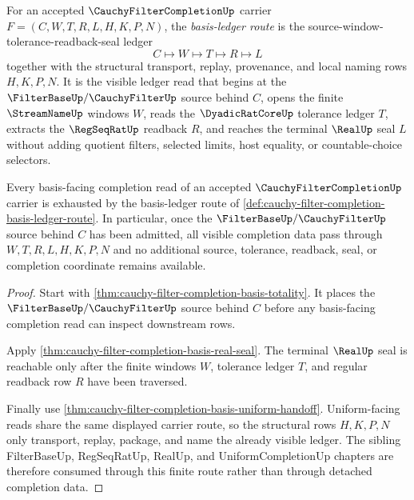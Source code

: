 \begin{definition}
\label{def:cauchy-filter-completion-basis-ledger-route}
For an accepted $\CauchyFilterCompletionUp$ carrier $F=(C,W,T,R,L,H,K,P,N)$, the \emph{basis-ledger route} is the source-window-tolerance-readback-seal ledger
$$
C \longmapsto W \longmapsto T \longmapsto R \longmapsto L
$$
together with the structural transport, replay, provenance, and local naming rows $H,K,P,N$. It is the visible ledger read that begins at the $\FilterBaseUp/\CauchyFilterUp$ source behind $C$, opens the finite $\StreamNameUp$ windows $W$, reads the $\DyadicRatCoreUp$ tolerance ledger $T$, extracts the $\RegSeqRatUp$ readback $R$, and reaches the terminal $\RealUp$ seal $L$ without adding quotient filters, selected limits, host equality, or countable-choice selectors.
\end{definition}

\begin{theorem}
\label{thm:cauchy-filter-completion-basis-ledger-exhaustion}
Every basis-facing completion read of an accepted $\CauchyFilterCompletionUp$ carrier is exhausted by the basis-ledger route of \autoref{def:cauchy-filter-completion-basis-ledger-route}. In particular, once the $\FilterBaseUp/\CauchyFilterUp$ source behind $C$ has been admitted, all visible completion data pass through $W,T,R,L,H,K,P,N$ and no additional source, tolerance, readback, seal, or completion coordinate remains available.
\end{theorem}
\begin{proof}
Start with \autoref{thm:cauchy-filter-completion-basis-totality}. It places the $\FilterBaseUp/\CauchyFilterUp$ source behind $C$ before any basis-facing completion read can inspect downstream rows.

Apply \autoref{thm:cauchy-filter-completion-basis-real-seal}. The terminal $\RealUp$ seal is reachable only after the finite windows $W$, tolerance ledger $T$, and regular readback row $R$ have been traversed.

Finally use \autoref{thm:cauchy-filter-completion-basis-uniform-handoff}. Uniform-facing reads share the same displayed carrier route, so the structural rows $H,K,P,N$ only transport, replay, package, and name the already visible ledger. The sibling FilterBaseUp, RegSeqRatUp, RealUp, and UniformCompletionUp chapters are therefore consumed through this finite route rather than through detached completion data.
\end{proof}

